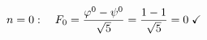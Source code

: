 \documentclass[preview]{standalone}
\begin{document}
\begin{align*}
\special{dvisvgm:raw <g id='unique000'>}n = 0: \quad F_0 = \frac{\varphi^0 - \psi^0}{\sqrt{5}}= \frac{1 - 1}{\sqrt{5}} = 0 \;\checkmark\special{dvisvgm:raw </g>}
\end{align*}
\end{document}
